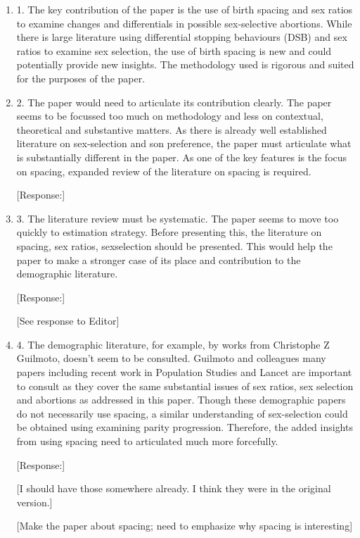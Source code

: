 \documentclass[letterpaper,12pt]{article}
\begin{document}
\begin{enumerate}
\item 1. The key contribution of the paper is the use of birth spacing and sex
ratios to examine changes and differentials in possible sex-selective
abortions. While there is large literature using differential stopping
behaviours (DSB) and sex ratios to examine sex selection, the use of
birth spacing is new and could potentially provide new insights. The
methodology used is rigorous and suited for the purposes of the paper.

\item 2. The paper would need to articulate its contribution clearly. The
paper seems to be focussed too much on methodology and less on
contextual, theoretical and substantive matters. As there is already
well established literature on sex-selection and son preference, the
paper must articulate what is substantially different in the paper. As
one of the key features is the focus on spacing, expanded review of the
literature on spacing is required.

[Response:]


\item 3. The literature review must be systematic. The paper seems to move too
quickly to estimation strategy. Before presenting this, the literature
on spacing, sex ratios, sexselection should be presented. This would
help the paper to make a stronger case of its place and contribution to
the demographic literature.

[Response:]

[See response to Editor]


\item 4. The demographic literature, for example, by works from Christophe Z
Guilmoto, doesn’t seem to be consulted. Guilmoto and colleagues many
papers including recent work in Population Studies and Lancet are
important to consult as they cover the same substantial issues of sex
ratios, sex selection and abortions as addressed in this paper. Though
these demographic papers do not necessarily use spacing, a similar
understanding of sex-selection could be obtained using examining parity
progression. Therefore, the added insights from using spacing need to
articulated much more forcefully.

[Response:]

[I should have those somewhere already. I think they were in the original version.]

[Make the paper about spacing; need to emphasize why spacing is interesting]


\end{enumerate}
\end{document}
